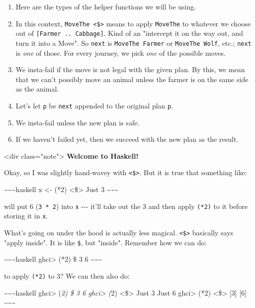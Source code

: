 \documentclass[]{article}
\begin{document}
\begin{enumerate}
\tightlist
\item
  Here are the types of the helper functions we will be using.
\item
  In this context, \texttt{MoveThe\ \textless{}\$\textgreater{}} means to apply
  \texttt{MoveThe} to whatever we choose out of
  \texttt{{[}Farmer\ ..\ Cabbage{]}}. Kind of an "intercept it on the way out,
  and turn it into a Move". So \texttt{next} is \texttt{MoveThe\ Farmer} or
  \texttt{MoveThe\ Wolf}, etc.; \texttt{next} is \emph{one} of those. For every
  journey, we pick \emph{one} of the possible moves.
\item
  We insta-fail if the move is not legal with the given plan. By this, we mean
  that we can't possibly move an animal unless the farmer is on the same side as
  the animal.
\item
  Let's let \texttt{p\textquotesingle{}} be \texttt{next} appended to the
  original plan \texttt{p}.
\item
  We insta-fail unless the new plan is safe.
\item
  If we haven't failed yet, then we succeed with the new plan as the result.
\end{enumerate}

\textless{}div class="note"\textgreater{} \textbf{Welcome to Haskell!}

Okay, so I was slightly hand-wavey with \texttt{\textless{}\$\textgreater{}}.
But it is true that something like:

\textasciitilde{}\textasciitilde{}\textasciitilde{}haskell x \textless{}- (*2)
\textless{}\$\textgreater{} Just 3
\textasciitilde{}\textasciitilde{}\textasciitilde{}

will put 6 (\texttt{3\ *\ 2}) into \texttt{x} -\/-\/- it'll take out the 3 and
then apply \texttt{(*2)} to it before storing it in \texttt{x}.

What's going on under the hood is actually less magical.
\texttt{\textless{}\$\textgreater{}} basically says "apply inside". It is like
\texttt{\$}, but "inside". Remember how we can do:

\textasciitilde{}\textasciitilde{}\textasciitilde{}haskell ghci\textgreater{}
(*2) \$ 3 6 \textasciitilde{}\textasciitilde{}\textasciitilde{}

to apply \texttt{(*2)} to 3? We can then also do:

\textasciitilde{}\textasciitilde{}\textasciitilde{}haskell ghci\textgreater{}
(\emph{2) \$ 3 6 ghci\textgreater{} (}2) \textless{}\$\textgreater{} Just 3 Just
6 ghci\textgreater{} (*2) \textless{}\$\textgreater{} {[}3{]} {[}6{]}
\textasciitilde{}\textasciitilde{}\textasciitilde{}
\end{document}
